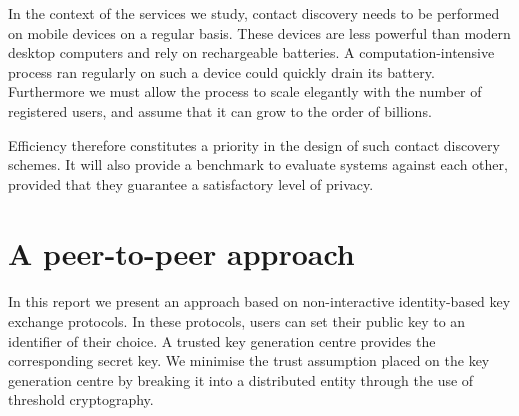 In the context of the services we study, contact discovery needs to be performed on mobile devices on a regular basis. These devices are less powerful than modern desktop computers and rely on rechargeable batteries. A computation-intensive process ran regularly on such a device could quickly drain its battery. Furthermore we must allow the process to scale elegantly with the number of registered users, and assume that it can grow to the order of billions.

Efficiency therefore constitutes a priority in the design of such contact discovery schemes. It will also provide a benchmark to evaluate systems against each other, provided that they guarantee a satisfactory level of privacy.




%


\section{A peer-to-peer approach}


\paragraph{} In this report we present an approach based on non-interactive identity-based key exchange protocols. In these protocols, users can set their public key to an identifier of their choice. A trusted key generation centre provides the corresponding secret key. We minimise the trust assumption placed on the key generation centre by breaking it into a distributed entity through the use of threshold cryptography.





